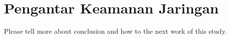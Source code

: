 \chapter{Pengantar Keamanan Jaringan}
Please tell more about conclusion and how to the next work of this study.